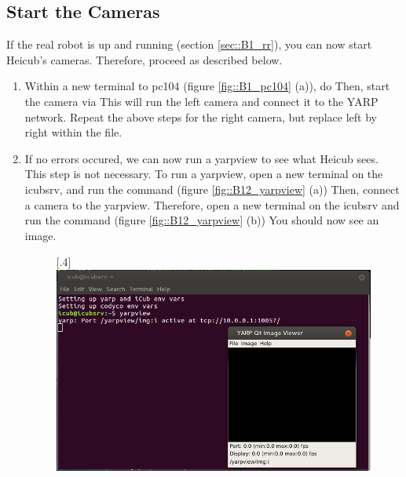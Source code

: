 \subsection{Start the Cameras}
\label{sec::B12_sc}
If the real robot is up and running (section \ref{sec::B1_rr}), you can now start Heicub's cameras. Therefore, proceed as described below.
\begin{enumerate}
	\item Within a new terminal to pc104 (figure \ref{fig::B1_pc104} (a)), do \newline {}\newline Then, start the camera via \newline {}\newline This will run the left camera and connect it to the YARP network. Repeat the above steps for the right camera, but replace left by right within the  file.
	\item If no errors occured, we can now run a yarpview to see what Heicub sees. This step is not necessary. To run a yarpview, open a new terminal on the icubsrv, and run the command \newline {} (figure \ref{fig::B12_yarpview} (a)) \newline Then, connect a camera to the yarpview. Therefore, open a new terminal on the icubsrv and run the command \newline {} (figure \ref{fig::B12_yarpview} (b)) \newline You should now see an image.
	\begin{figure}[h!]
		\centering
		[.4\linewidth]{\includegraphics[scale=.22]{chapters/06_appendix/img/yarpview.png}}

\end{figure}
\end{enumerate}
